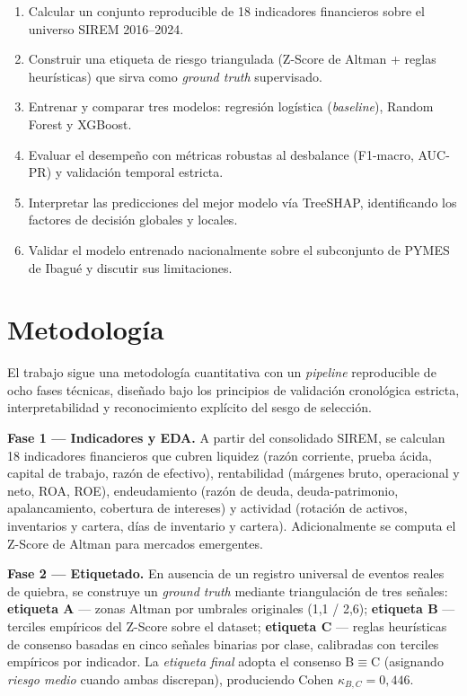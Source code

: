\documentclass[12pt, letterpaper]{article}
\newcommand{\zaltscore}{Z\textquotesingle\textquotesingle-Score}
\begin{document}
\begin{enumerate}
\item Calcular un conjunto reproducible de 18 indicadores financieros sobre el universo SIREM 2016--2024.
\item Construir una etiqueta de riesgo triangulada (\zaltscore{} de Altman + reglas heur\'isticas) que sirva como \textit{ground truth} supervisado.
\item Entrenar y comparar tres modelos: regresi\'on log\'istica (\textit{baseline}), Random Forest y XGBoost.
\item Evaluar el desempe\~no con m\'etricas robustas al desbalance (F1-macro, AUC-PR) y validaci\'on temporal estricta.
\item Interpretar las predicciones del mejor modelo v\'ia TreeSHAP, identificando los factores de decisi\'on globales y locales.
\item Validar el modelo entrenado nacionalmente sobre el subconjunto de PYMES de Ibagu\'e y discutir sus limitaciones.
\end{enumerate}

\section{Metodolog\'ia}
\label{sec:metodologia}

El trabajo sigue una metodolog\'ia cuantitativa con un \textit{pipeline} reproducible de ocho fases t\'ecnicas, dise\~nado bajo los principios de validaci\'on cronol\'ogica estricta, interpretabilidad y reconocimiento expl\'icito del sesgo de selecci\'on.

\textbf{Fase 1 --- Indicadores y EDA.} A partir del consolidado SIREM, se calculan 18 indicadores financieros que cubren liquidez (raz\'on corriente, prueba \'acida, capital de trabajo, raz\'on de efectivo), rentabilidad (m\'argenes bruto, operacional y neto, ROA, ROE), endeudamiento (raz\'on de deuda, deuda-patrimonio, apalancamiento, cobertura de intereses) y actividad (rotaci\'on de activos, inventarios y cartera, d\'ias de inventario y cartera). Adicionalmente se computa el \zaltscore{} de Altman para mercados emergentes.

\textbf{Fase 2 --- Etiquetado.} En ausencia de un registro universal de eventos reales de quiebra, se construye un \textit{ground truth} mediante triangulaci\'on de tres se\~nales: \textbf{etiqueta A} --- zonas Altman por umbrales originales (1,1 / 2,6); \textbf{etiqueta B} --- terciles emp\'iricos del \zaltscore{} sobre el dataset; \textbf{etiqueta C} --- reglas heur\'isticas de consenso basadas en cinco se\~nales binarias por clase, calibradas con terciles emp\'iricos por indicador. La \textit{etiqueta final} adopta el consenso B$\equiv$C (asignando \textit{riesgo medio} cuando ambas discrepan), produciendo Cohen $\kappa_{B,C} = 0{,}446$.
\end{document}
